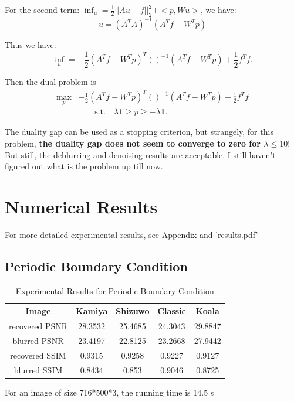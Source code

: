 \documentclass{article}
\theoremstyle{plain} \newtheorem{thm}{Theorem}
\begin{document}
For the second term: $\inf_u = \frac{1}{2}||Au - f||_2^2 + <p, Wu>$, we have:
$$u = (A^TA)^{-1}(A^Tf - W^T p)$$

Thus we have: $$\inf_u = -\frac{1}{2}(A^Tf - W^Tp)^T()^{-1}(A^Tf - W^Tp) + \frac{1}{2} f^Tf.$$

Then the dual problem is
\begin{align*}
	\max_{p} & -\frac{1}{2}(A^Tf - W^Tp)^T()^{-1}(A^Tf - W^Tp) + \frac{1}{2} f^Tf\\
	&\qquad	\text{s.t.} \quad \lambda \mathbf{1} \ge p \ge -\lambda \mathbf{1}.
\end{align*}

The duality gap can be used as a stopping criterion, but strangely, for this problem, \textbf{the duality gap does not seem to converge to zero for $\lambda \le 10!$} But still, the deblurring and denoising results are acceptable. I still haven't figured out what is the problem up till now.
\section{Numerical Results}
For more detailed experimental results, see Appendix and 'results.pdf'
\subsection{Periodic Boundary Condition}
\begin{table}[htbp]
	\centering
	\caption{Experimental Results for Periodic Boundary Condition}
	\begin{tabular}{c|cccc}
		\toprule[.07cm]
		Image & Kamiya & Shizuwo & Classic & Koala \\
		\midrule[.07cm]
		recovered PSNR & 28.3532 & 25.4685 & 24.3043 & 29.8847 \\
		blurred PSNR & 23.4197 & 22.8125 & 23.2668 & 27.9442 \\
		\midrule
		recovered SSIM & 0.9315 & 0.9258 & 0.9227 & 0.9127 \\
		blurred SSIM & 0.8434 & 0.853 & 0.9046 & 0.8725 \\
		\bottomrule[.07cm]
	\end{tabular}%
	\label{tab:1}%
\end{table}%

For an image of size 716*500*3, the running time is 14.5 s
\end{document}
